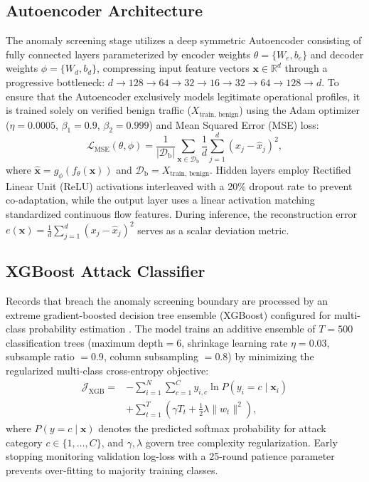 \documentclass[journal]{IEEEtran}
\begin{document}
\subsection{Autoencoder Architecture}
The anomaly screening stage utilizes a deep symmetric Autoencoder consisting of fully connected layers parameterized by encoder weights $\theta = \{W_e, b_e\}$ and decoder weights $\phi = \{W_d, b_d\}$, compressing input feature vectors $\mathbf{x} \in \mathbb{R}^d$ through a progressive bottleneck: $d \rightarrow 128 \rightarrow 64 \rightarrow 32 \rightarrow 16 \rightarrow 32 \rightarrow 64 \rightarrow 128 \rightarrow d$. To ensure that the Autoencoder exclusively models legitimate operational profiles, it is trained solely on verified benign traffic ($X_{\text{train, benign}}$) using the Adam optimizer ($\eta = 0.0005$, $\beta_1 = 0.9$, $\beta_2 = 0.999$) and Mean Squared Error (MSE) loss:
\begin{equation}
\mathcal{L}_{\text{MSE}}(\theta, \phi) = \frac{1}{|\mathcal{D}_{\text{b}}|}\sum_{\mathbf{x} \in \mathcal{D}_{\text{b}}}\frac{1}{d}\sum_{j=1}^d \left(x_j - \hat{x}_j\right)^2,
\end{equation}
where $\hat{\mathbf{x}} = g_\phi(f_\theta(\mathbf{x}))$ and $\mathcal{D}_{\text{b}} = X_{\text{train, benign}}$. Hidden layers employ Rectified Linear Unit (ReLU) activations interleaved with a 20\% dropout rate to prevent co-adaptation, while the output layer uses a linear activation matching standardized continuous flow features. During inference, the reconstruction error $e(\mathbf{x}) = \frac{1}{d}\sum_{j=1}^d (x_j - \hat{x}_j)^2$ serves as a scalar deviation metric.

\subsection{XGBoost Attack Classifier}
Records that breach the anomaly screening boundary are processed by an extreme gradient-boosted decision tree ensemble (XGBoost) configured for multi-class probability estimation \cite{abdulganiyu2024}. The model trains an additive ensemble of $T = 500$ classification trees ($\text{maximum depth} = 6$, shrinkage learning rate $\eta = 0.03$, subsample ratio $= 0.9$, column subsampling $= 0.8$) by minimizing the regularized multi-class cross-entropy objective:
\begin{equation}
\begin{aligned}
\mathcal{J}_{\text{XGB}} = &-\sum_{i=1}^N \sum_{c=1}^C y_{i,c} \ln P(y_i = c \mid \mathbf{x}_i) \\
&+ \sum_{t=1}^T \left(\gamma T_t + \frac{1}{2}\lambda \|w_t\|^2\right),
\end{aligned}
\end{equation}
where $P(y = c \mid \mathbf{x})$ denotes the predicted softmax probability for attack category $c \in \{1, \dots, C\}$, and $\gamma, \lambda$ govern tree complexity regularization. Early stopping monitoring validation log-loss with a 25-round patience parameter prevents over-fitting to majority training classes.
\end{document}

